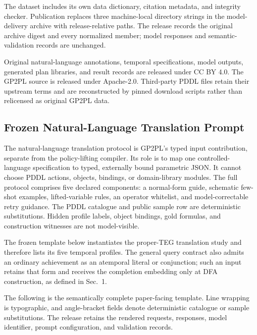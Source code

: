 The dataset includes its own data dictionary, citation metadata, and integrity
checker. Publication replaces three machine-local directory strings in the
model-delivery archive with release-relative paths. The release records the
original archive digest and every normalized member; model responses and
semantic-validation records are unchanged.

Original natural-language annotations, temporal specifications, model outputs,
generated plan libraries, and result records are released under CC BY 4.0. The
GP2PL source is released under Apache-2.0. Third-party PDDL files retain their
upstream terms and are reconstructed by pinned download scripts rather than
relicensed as original GP2PL data.

\subsection{Frozen Natural-Language Translation Prompt}
\label{app:translation-prompt}

The natural-language translation protocol is GP2PL's typed input contribution,
separate from the policy-lifting compiler. Its role is to map one controlled-language
specification to typed, externally bound parametric \ltlf{} JSON. It cannot
choose PDDL actions, objects, bindings, or domain-library modules. The full
protocol comprises five declared components: a normal-form guide,
schematic few-shot examples, lifted-variable rules, an operator whitelist, and
model-correctable retry guidance. The PDDL catalogue and public sample row are
deterministic substitutions. Hidden profile labels, object bindings, gold
formulas, and construction witnesses are not model-visible.

The frozen template below instantiates the proper-TEG translation study and
therefore lists its five temporal profiles. The general query contract also
admits an ordinary achievement as an atemporal literal or conjunction; such an
input retains that form and receives the completion embedding only at DFA
construction, as defined in Sec.~1.

The following is the semantically complete paper-facing template. Line wrapping
is typographic, and angle-bracket fields denote deterministic catalogue or
sample substitutions. The release retains the rendered requests, responses,
model identifier, prompt configuration, and validation records.

